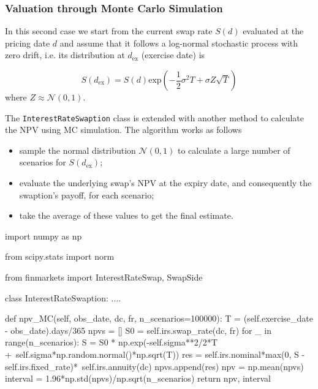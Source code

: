\subsubsection{Valuation through Monte Carlo Simulation}
\label{evaluation-through-monte-carlo-simulation}

In this second case we start from the current swap rate $S(d)$ evaluated at the pricing date $d$ and assume that it follows a log-normal stochastic process with zero drift, i.e. its distribution at $d_{\mathrm{ex}}$ (exercise date) is 

\begin{equation*}
S(d_{\mathrm{ex}}) = S(d)\mathrm{exp}(-\frac{1}{2}\sigma^{2}T+\sigma Z\sqrt{T})
\end{equation*}
\noindent
where $Z\approx\mathcal{N}(0,1)$. %

\begin{finmarkets}
The \texttt{InterestRateSwaption} class is extended with another method to calculate the NPV using MC simulation.
The algorithm works as follows

\begin{itemize}
\tightlist
\item sample the normal distribution $\mathcal{N}(0, 1)$ to calculate a large number of scenarios for $S(d_{\mathrm{ex}})$;
\item evaluate the underlying swap's NPV at the expiry date, and consequently the swaption's payoff, for each scenario;
\item take the average of these values to get the final estimate.
\end{itemize}
\end{finmarkets}

\begin{ipython}
import numpy as np

from scipy.stats import norm

from finmarkets import InterestRateSwap, SwapSide

class InterestRateSwaption:
    ....

    def npv_MC(self, obs_date, dc, fr, n_scenarios=100000):
        T = (self.exercise_date - obs_date).days/365
        npvs = []
        S0 = self.irs.swap_rate(dc, fr)
        for _ in range(n_scenarios):
            S = S0 * np.exp(-self.sigma**2/2*T +\
                            self.sigma*np.random.normal()*np.sqrt(T))
            res = self.irs.nominal*max(0, S - self.irs.fixed_rate)*\
                  self.irs.annuity(dc)
            npvs.append(res)
        npv = np.mean(npvs)
        interval = 1.96*np.std(npvs)/np.sqrt(n_scenarios)
        return npv, interval
\end{ipython}


